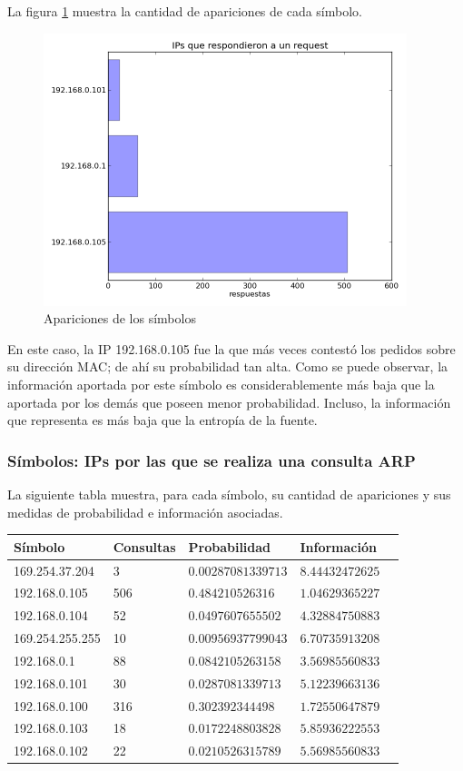 \documentclass{article}
\begin{document}
La figura \ref{fig:red1repliers:count} muestra la cantidad de apariciones de
cada símbolo.

\begin{figure}[h!]
    \centering
    \includegraphics[width=300pt]{red1repliers.png}
    \caption{Apariciones de los símbolos}
    \label{fig:red1repliers:count}
\end{figure}

En este caso, la IP 192.168.0.105 fue la que más veces contestó los pedidos
sobre su dirección MAC; de ahí su probabilidad tan alta. Como se puede
observar, la información aportada por este símbolo es considerablemente más
baja que la aportada por los demás que poseen menor probabilidad. Incluso, la
información que representa es más baja que la entropía de la fuente.
\newpage

\subsubsection{Símbolos: IPs por las que se realiza una consulta ARP}
La siguiente tabla muestra, para cada símbolo, su cantidad de apariciones y
sus medidas de probabilidad e información asociadas.

\vskip10pt

\begin{tabular}{|l|l|l|l|l|}
  \hline
  Símbolo & Consultas & Probabilidad & Información \\
  \hline
  169.254.37.204 & 3 & $0.00287081339713$ & $8.44432472625$\\
  \hline
  192.168.0.105 & 506 & $0.484210526316$ & $1.04629365227$\\
  \hline
  192.168.0.104 & 52 & $0.0497607655502$ & $4.32884750883$\\
  \hline
  169.254.255.255 & 10 & $0.00956937799043$ & $6.70735913208$\\
  \hline
  192.168.0.1 & 88 & $0.0842105263158$ & $3.56985560833$\\
  \hline
  192.168.0.101 & 30 & $0.0287081339713$ & $5.12239663136$\\
  \hline
  192.168.0.100 & 316 & $0.302392344498$ & $1.72550647879$\\
  \hline
  192.168.0.103 & 18 & $0.0172248803828$ & $5.85936222553$\\
  \hline
  192.168.0.102 & 22 & $0.0210526315789$ & $5.56985560833$\\
  \hline
\end{tabular}
\end{document}
